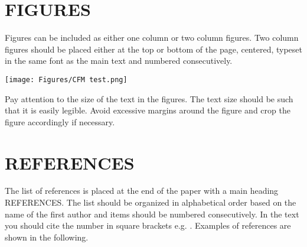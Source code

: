 \documentclass[a4paper, english, 9pt,twocolumn]{extarticle} %
\renewcommand\_[2][1]{\ifmmode _{\textnormal{\scalebox{#1}{#2}}}\else\underscore#2\fi} %
\renewcommand\^[2][1]{\ifmmode ^{\textnormal{\scalebox{#1}{#2}}}\else\xor#2\fi} %
\begin{document}
\section*{FIGURES}
Figures can be included as either one column or two column figures. Two column figures should be placed either at the top or bottom of the page, centered, typeset in the same font as the main text and numbered consecutively.

\begin{center}
    \texttt{[image: Figures/CFM test.png]}
    \label{fig:ExampleFigure}
\end{center}

Pay attention to the size of the text in the figures. The text size should be such that it is easily legible. Avoid excessive margins around the figure and crop the figure accordingly if necessary.

\section*{REFERENCES}
The list of references is placed at the end of the paper with a main heading REFERENCES. The list should be organized in alphabetical order based on the name of the first author and items should be numbered consecutively. In the text you should cite the number in square brackets e.g. \cite{Hanninen2016, Tu2012}. %
Examples of references are shown in the following.

\printbibliography[title={REFERENCES}] %
\end{document}
